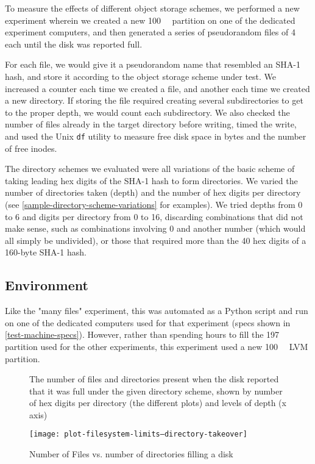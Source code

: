 To measure the effects of different object storage schemes, we performed a new
experiment wherein we created a new \SI{100}{\mebi\byte} partition on one of the
dedicated experiment computers, and then generated a series of pseudorandom
files of \SI{4}{\kibi\byte} each until the disk was reported full.

For each file, we would give it a pseudorandom name that resembled an SHA-1
hash, and store it according to the object storage scheme under test. We
increased a counter each time we created a file, and another each time we
created a new directory. If storing the file required creating several
subdirectories to get to the proper depth, we would count each subdirectory. We
also checked the number of files already in the target directory before writing,
timed the write, and used the Unix \lstinline{df} utility to measure free disk
space in bytes and the number of free \glspl{inode}.

The directory schemes we evaluated were all variations of the basic scheme of
taking leading hex digits of the SHA-1 hash to form directories. We varied the
number of directories taken (depth) and the number of hex digits per directory
(see \autoref{sample-directory-scheme-variations} for examples). We tried depths
from \num{0} to \num{6} and digits per directory from \num{0} to \num{16},
discarding combinations that did not make sense, such as combinations involving
\num{0} and another number (which would all simply be undivided), or those that
required more than the \num{40} hex digits of a \num{160}-byte SHA-1 hash.

\subsection{Environment}

Like the "many files" experiment, this was automated as a Python script and run
on one of the dedicated computers used for that experiment (specs shown in
\autoref{test-machine-specs}). However, rather than spending hours to fill the
\SI{197}{\gibi\byte} partition used for the other experiments, this experiment
used a new \SI{100}{\mebi\byte} LVM partition.


\begin{figure}[b!]
        \caption{Number of Files vs. number of directories filling a disk}
        \label{fig:plot-filesystem-limits--directory-takeover}
        \centering

        The number of files and directories present when the disk reported that it
        was full under the given directory scheme, shown by number of hex digits per
        directory (the different plots) and levels of depth (x axis)

        \texttt{[image: plot-filesystem-limits--directory-takeover]}
\end{figure}

